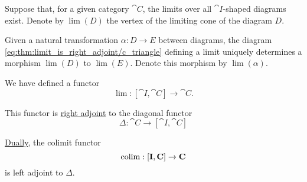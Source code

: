 \begin{proposition}\label{thm:limit_is_right_adjoint}
  Suppose that, for a given category \( \cat{C} \), the limits over all \( \cat{I} \)-shaped diagrams exist. Denote by \( \lim(D) \) the vertex of the limiting cone of the diagram \( D \).

  Given a natural transformation \( \alpha: D \to E \) between diagrams, the diagram \eqref{eq:thm:limit_is_right_adjoint/c_triangle} defining a limit uniquely determines a morphism \( \lim(D) \) to \( \lim(E) \). Denote this morphism by \( \lim(\alpha) \).

  We have defined a functor
  \begin{equation*}
    \lim: [\cat{I}, \cat{C}] \to \cat{C}.
  \end{equation*}

  This functor is \hyperref[def:category_adjunction]{right adjoint} to the diagonal functor
  \begin{equation*}
    \Delta: \cat{C} \to [\cat{I}, \cat{C}]
  \end{equation*}

  \hyperref[rem:categorical_principle_of_duality]{Dually}, the colimit functor
  \begin{equation*}
    \operatorname*{co\negthinspace\lim}: [\operatorname{\mathbf{I}}, \operatorname{\mathbf{C}}] \to \operatorname{\mathbf{C}}
  \end{equation*}
  is left adjoint to \( \Delta \).
\end{proposition}
